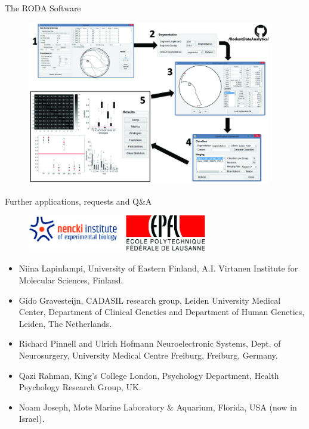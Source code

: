 \documentclass{beamer}
\newlength{\tmpShadow}
\newcommand{\MyShadow}[2]{%
	\settowidth{\tmpShadow}{#1}
	\addtolength{\tmpShadow}{.1em}
	\raisebox{-0.25ex}{\textcolor{gray!70}{#1}}%
	\kern-\tmpShadow%
	\textcolor{#2}{#1}%
}
\begin{document}
{\begin{frame}{The RODA Software}	
	\begin{figure}[H]
		\centering
		\includegraphics[width=0.95\textwidth]{figures/roda}
	\end{figure}
	\vspace{15mm}
\end{frame}

\begin{frame}{Further applications, requests and Q\&A}	
	\begin{figure}[H]
		\centering
		\includegraphics[width=0.7\textwidth]{figures/cols}
	\end{figure}
	\begin{itemize}[label={\MyShadow{$\bullet$}{blue!80}}]
		\item Niina Lapinlampi, University of Eastern Finland, A.I. Virtanen Institute for Molecular Sciences, Finland.
		\item Gido Gravesteijn, CADASIL research group, Leiden University Medical Center, Department of Clinical Genetics and Department of Human Genetics, Leiden, The Netherlands.
		\item Richard Pinnell and Ulrich Hofmann Neuroelectronic Systems, Dept. of Neurosurgery, University Medical Centre Freiburg, Freiburg, Germany.
		\item Qazi Rahman, King's College London, Psychology Department, Health Psychology Research Group, UK.
		\item Noam Joseph, Mote Marine Laboratory \& Aquarium, Florida, USA (now in Israel).
	\end{itemize}
\end{frame}

}
\end{document}
